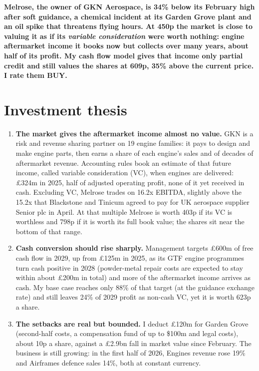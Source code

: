 \documentclass[10pt]{article}
\begin{document}
\noindent
\begin{minipage}[t]{0.63\textwidth}
\vspace{0pt}
\textbf{Melrose, the owner of GKN Aerospace, is 34\% below its February high after soft guidance, a chemical incident at its Garden Grove plant and an oil spike that threatens flying hours. At 450p the market is close to valuing it as if its \emph{variable consideration} were worth nothing: engine aftermarket income it books now but collects over many years, about half of its profit. My cash flow model gives that income only partial credit and still values the shares at 609p, 35\% above the current price. I rate them BUY.}

\section{Investment thesis}
\begin{enumerate}[leftmargin=1.3em,itemsep=0.45ex]
\item \textbf{The market gives the aftermarket income almost no value.} GKN is a risk and revenue sharing partner on 19 engine families: it pays to design and make engine parts, then earns a share of each engine's sales and of decades of aftermarket revenue. Accounting rules book an estimate of that future income, called variable consideration (VC), when engines are delivered: \pounds324m in 2025, half of adjusted operating profit, none of it yet received in cash. Excluding VC, Melrose trades on 16.2x EBITDA, slightly above the 15.2x that Blackstone and Tinicum agreed to pay for UK aerospace supplier Senior plc in April. At that multiple Melrose is worth 403p if its VC is worthless and 798p if it is worth its full book value; the shares sit near the bottom of that range.
\item \textbf{Cash conversion should rise sharply.} Management targets \pounds600m of free cash flow in 2029, up from \pounds125m in 2025, as its GTF engine programmes turn cash positive in 2028 (powder-metal repair costs are expected to stay within about \pounds200m in total) and more of the aftermarket income arrives as cash. My base case reaches only 88\% of that target (at the guidance exchange rate) and still leaves 24\% of 2029 profit as non-cash VC, yet it is worth 623p a share.
\item \textbf{The setbacks are real but bounded.} I deduct \pounds120m for Garden Grove (second-half costs, a compensation fund of up to \$100m and legal costs), about 10p a share, against a \pounds2.9bn fall in market value since February. The business is still growing: in the first half of 2026, Engines revenue rose 19\% and Airframes defence sales 14\%, both at constant currency.
\end{enumerate}
\end{minipage}\hfill
\end{document}
